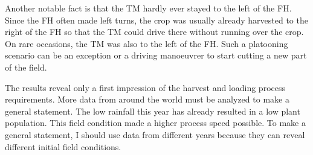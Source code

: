 Another notable fact is that the \ac{TM} hardly ever stayed to the left of the \ac{FH}.
Since the \ac{FH} often made left turns, the crop was usually already harvested to the right of the \ac{FH} so
that the \ac{TM} could drive there without running over the crop.
On rare occasions, the \ac{TM} was also to the left of the \ac{FH}.
Such a platooning scenario can be an exception or a driving manoeuvrer to start cutting a new part of the field.

The results reveal only a first impression of the harvest and loading process requirements.
More data from around the world must be analyzed to make a general statement.
The low rainfall this year has already resulted in a low plant population.
This field condition made a higher process speed possible.
To make a general statement, I should use data from different years because they can reveal different initial field conditions.

